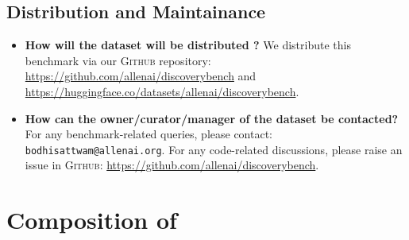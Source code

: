 \subsection{Distribution and Maintainance}
\begin{itemize}
    \item \textbf{How will the dataset will be distributed ?}
    We distribute this benchmark via our \textsc{Github} repository: \url{https://github.com/allenai/discoverybench} and \url{https://huggingface.co/datasets/allenai/discoverybench}.
    \item \textbf{How can the owner/curator/manager of the dataset be contacted?} For any benchmark-related queries, please contact: \texttt{bodhisattwam@allenai.org}. For any code-related discussions, please raise an issue in \textsc{Github}: \url{https://github.com/allenai/discoverybench}.
\end{itemize}

\section{Composition of \discoverybench{}}
\label{sec:datadetails}



